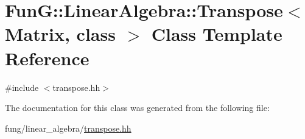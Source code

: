 \hypertarget{classFunG_1_1LinearAlgebra_1_1Transpose}{\section{Fun\-G\-:\-:Linear\-Algebra\-:\-:Transpose$<$ Matrix, class $>$ Class Template Reference}
\label{classFunG_1_1LinearAlgebra_1_1Transpose}
}


{\ttfamily \#include $<$transpose.\-hh$>$}



The documentation for this class was generated from the following file\-:\begin{DoxyCompactItemize}
\item 
fung/linear\-\_\-algebra/\hyperlink{transpose_8hh}{transpose.\-hh}\end{DoxyCompactItemize}
